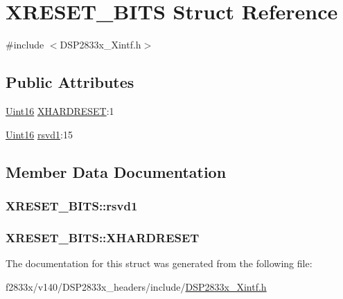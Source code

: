 \hypertarget{struct_x_r_e_s_e_t___b_i_t_s}{}\section{X\+R\+E\+S\+E\+T\+\_\+\+B\+I\+T\+S Struct Reference}
\label{struct_x_r_e_s_e_t___b_i_t_s}


{\ttfamily \#include $<$D\+S\+P2833x\+\_\+\+Xintf.\+h$>$}

\subsection*{Public Attributes}
\begin{DoxyCompactItemize}
\item 
\hyperlink{_d_s_p2833x___device_8h_a59a9f6be4562c327cbfb4f7e8e18f08b}{Uint16} \hyperlink{struct_x_r_e_s_e_t___b_i_t_s_afc5be5f2f2c424e17613ab5a6478f4da}{X\+H\+A\+R\+D\+R\+E\+S\+E\+T}\+:1
\item 
\hyperlink{_d_s_p2833x___device_8h_a59a9f6be4562c327cbfb4f7e8e18f08b}{Uint16} \hyperlink{struct_x_r_e_s_e_t___b_i_t_s_a43e3a0a6e150647e8ad502a6d2dc7622}{rsvd1}\+:15
\end{DoxyCompactItemize}


\subsection{Member Data Documentation}
\hypertarget{struct_x_r_e_s_e_t___b_i_t_s_a43e3a0a6e150647e8ad502a6d2dc7622}{}
\subsubsection[{rsvd1}]{ X\+R\+E\+S\+E\+T\+\_\+\+B\+I\+T\+S\+::rsvd1}\label{struct_x_r_e_s_e_t___b_i_t_s_a43e3a0a6e150647e8ad502a6d2dc7622}
\hypertarget{struct_x_r_e_s_e_t___b_i_t_s_afc5be5f2f2c424e17613ab5a6478f4da}{}
\subsubsection[{X\+H\+A\+R\+D\+R\+E\+S\+E\+T}]{ X\+R\+E\+S\+E\+T\+\_\+\+B\+I\+T\+S\+::\+X\+H\+A\+R\+D\+R\+E\+S\+E\+T}\label{struct_x_r_e_s_e_t___b_i_t_s_afc5be5f2f2c424e17613ab5a6478f4da}


The documentation for this struct was generated from the following file\+:\begin{DoxyCompactItemize}
\item 
f2833x/v140/\+D\+S\+P2833x\+\_\+headers/include/\hyperlink{_d_s_p2833x___xintf_8h}{D\+S\+P2833x\+\_\+\+Xintf.\+h}\end{DoxyCompactItemize}
